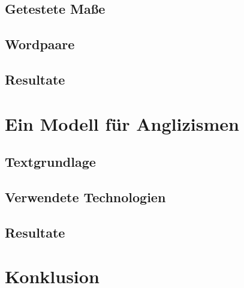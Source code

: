 \documentclass[11pt,numbers=noenddot]{scrartcl}
\newtheorem*{document frequency}{Definition}
\begin{document}
\subsection{Getestete Maße}

\subsection{Wordpaare}

\subsection{Resultate}

\section{Ein Modell für Anglizismen}

\subsection{Textgrundlage}

\subsection{Verwendete Technologien}

\subsection{Resultate}

\section{Konklusion}

\nocite{han2011}
\nocite{heyer2008}
\nocite{manning1999}


\end{document}
